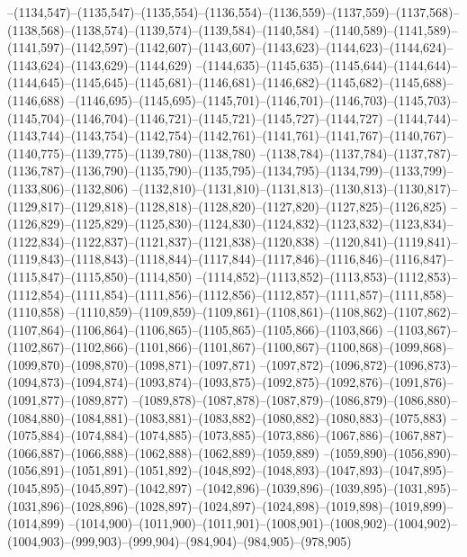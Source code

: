 --(1134,547)--(1135,547)--(1135,554)--(1136,554)--(1136,559)--(1137,559)--(1137,568)--(1138,568)--(1138,574)--(1139,574)--(1139,584)--(1140,584)
--(1140,589)--(1141,589)--(1141,597)--(1142,597)--(1142,607)--(1143,607)--(1143,623)--(1144,623)--(1144,624)--(1143,624)--(1143,629)--(1144,629)
--(1144,635)--(1145,635)--(1145,644)--(1144,644)--(1144,645)--(1145,645)--(1145,681)--(1146,681)--(1146,682)--(1145,682)--(1145,688)--(1146,688)
--(1146,695)--(1145,695)--(1145,701)--(1146,701)--(1146,703)--(1145,703)--(1145,704)--(1146,704)--(1146,721)--(1145,721)--(1145,727)--(1144,727)
--(1144,744)--(1143,744)--(1143,754)--(1142,754)--(1142,761)--(1141,761)--(1141,767)--(1140,767)--(1140,775)--(1139,775)--(1139,780)--(1138,780)
--(1138,784)--(1137,784)--(1137,787)--(1136,787)--(1136,790)--(1135,790)--(1135,795)--(1134,795)--(1134,799)--(1133,799)--(1133,806)--(1132,806)
--(1132,810)--(1131,810)--(1131,813)--(1130,813)--(1130,817)--(1129,817)--(1129,818)--(1128,818)--(1128,820)--(1127,820)--(1127,825)--(1126,825)
--(1126,829)--(1125,829)--(1125,830)--(1124,830)--(1124,832)--(1123,832)--(1123,834)--(1122,834)--(1122,837)--(1121,837)--(1121,838)--(1120,838)
--(1120,841)--(1119,841)--(1119,843)--(1118,843)--(1118,844)--(1117,844)--(1117,846)--(1116,846)--(1116,847)--(1115,847)--(1115,850)--(1114,850)
--(1114,852)--(1113,852)--(1113,853)--(1112,853)--(1112,854)--(1111,854)--(1111,856)--(1112,856)--(1112,857)--(1111,857)--(1111,858)--(1110,858)
--(1110,859)--(1109,859)--(1109,861)--(1108,861)--(1108,862)--(1107,862)--(1107,864)--(1106,864)--(1106,865)--(1105,865)--(1105,866)--(1103,866)
--(1103,867)--(1102,867)--(1102,866)--(1101,866)--(1101,867)--(1100,867)--(1100,868)--(1099,868)--(1099,870)--(1098,870)--(1098,871)--(1097,871)
--(1097,872)--(1096,872)--(1096,873)--(1094,873)--(1094,874)--(1093,874)--(1093,875)--(1092,875)--(1092,876)--(1091,876)--(1091,877)--(1089,877)
--(1089,878)--(1087,878)--(1087,879)--(1086,879)--(1086,880)--(1084,880)--(1084,881)--(1083,881)--(1083,882)--(1080,882)--(1080,883)--(1075,883)
--(1075,884)--(1074,884)--(1074,885)--(1073,885)--(1073,886)--(1067,886)--(1067,887)--(1066,887)--(1066,888)--(1062,888)--(1062,889)--(1059,889)
--(1059,890)--(1056,890)--(1056,891)--(1051,891)--(1051,892)--(1048,892)--(1048,893)--(1047,893)--(1047,895)--(1045,895)--(1045,897)--(1042,897)
--(1042,896)--(1039,896)--(1039,895)--(1031,895)--(1031,896)--(1028,896)--(1028,897)--(1024,897)--(1024,898)--(1019,898)--(1019,899)--(1014,899)
--(1014,900)--(1011,900)--(1011,901)--(1008,901)--(1008,902)--(1004,902)--(1004,903)--(999,903)--(999,904)--(984,904)--(984,905)--(978,905)
